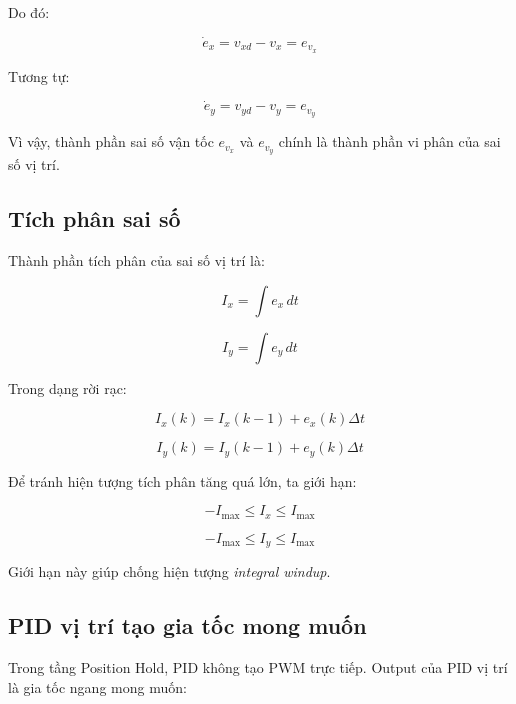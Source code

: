 Do đó:

\begin{equation}
    \dot{e}_x = v_{xd} - v_x = e_{v_x}
\end{equation}

Tương tự:

\begin{equation}
    \dot{e}_y = v_{yd} - v_y = e_{v_y}
\end{equation}

Vì vậy, thành phần sai số vận tốc $e_{v_x}$ và $e_{v_y}$ chính là thành phần
vi phân của sai số vị trí.

\subsection{Tích phân sai số}

Thành phần tích phân của sai số vị trí là:

\begin{equation}
    I_x = \int e_x\,dt
\end{equation}

\begin{equation}
    I_y = \int e_y\,dt
\end{equation}

Trong dạng rời rạc:

\begin{equation}
    I_x(k) = I_x(k-1) + e_x(k)\Delta t
\end{equation}

\begin{equation}
    I_y(k) = I_y(k-1) + e_y(k)\Delta t
\end{equation}

Để tránh hiện tượng tích phân tăng quá lớn, ta giới hạn:

\begin{equation}
    -I_{\max} \leq I_x \leq I_{\max}
\end{equation}

\begin{equation}
    -I_{\max} \leq I_y \leq I_{\max}
\end{equation}

Giới hạn này giúp chống hiện tượng \textit{integral windup}.

\subsection{PID vị trí tạo gia tốc mong muốn}

Trong tầng Position Hold, PID không tạo PWM trực tiếp.
Output của PID vị trí là gia tốc ngang mong muốn:

